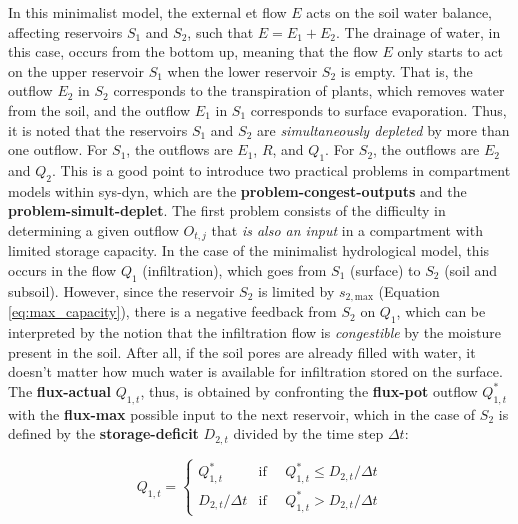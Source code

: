 \documentclass[./main_en.tex]{subfiles}
\begin{document}
\par In this minimalist \gls{model}, the external \acrlong{et} flow $E$ acts on the soil water balance, affecting reservoirs $S_1$ and $S_2$, such that $E = E_1 + E_2$. The drainage of water, in this case, occurs from the bottom up, meaning that the flow $E$ only starts to act on the upper reservoir $S_1$ when the lower reservoir $S_2$ is empty. That is, the outflow $E_2$ in $S_2$ corresponds to the transpiration of plants, which removes water from the soil, and the outflow $E_1$ in $S_1$ corresponds to surface evaporation. Thus, it is noted that the reservoirs $S_1$ and $S_2$ are \textit{simultaneously depleted} by more than one outflow. For $S_1$, the outflows are $E_1$, $R$, and $Q_1$. For $S_2$, the outflows are $E_2$ and $Q_2$. This is a good point to introduce two practical problems in compartment models within \gls{sys-dyn}, which are the \textbf{\gls{problem-congest-outputs}} and the \textbf{\gls{problem-simult-deplet}}. The first problem consists of the difficulty in determining a given outflow $O_{t,j}$ that \textit{is also an input} in a compartment with limited storage capacity. In the case of the minimalist hydrological model, this occurs in the flow $Q_1$ (infiltration), which goes from $S_1$ (surface) to $S_2$ (soil and subsoil). However, since the reservoir $S_2$ is limited by $s_{2, \text{max}}$ (Equation \eqref{eq:max_capacity}), there is a negative \gls{feedback} from $S_2$ on $Q_1$, which can be interpreted by the notion that the infiltration flow is \textit{congestible} by the moisture present in the soil. After all, if the soil pores are already filled with water, it doesn't matter how much water is available for infiltration stored on the surface. The \textbf{\gls{flux-actual}} $Q_{1,t}$, thus, is obtained by confronting the \textbf{\gls{flux-pot}} outflow $Q^*_{1,t}$ with the \textbf{\gls{flux-max}} possible input to the next reservoir, which in the case of $S_2$ is defined by the \textbf{\gls{storage-deficit}} $D_{2,t}$ divided by the time step $\Delta t$:
\begin{linenomath*}
\begin{equation} 
	\label{eq:congest_1}
 Q_{1,t} = 
\begin{cases} 
    Q^*_{1,t} & \text{if } \quad Q^*_{1,t} \leq D_{2,t} / \Delta t\\
    D_{2,t} / \Delta t & \text{if } \quad Q^*_{1,t} > D_{2,t} / \Delta t
\end{cases}
\end{equation}
\end{linenomath*}
\end{document}

